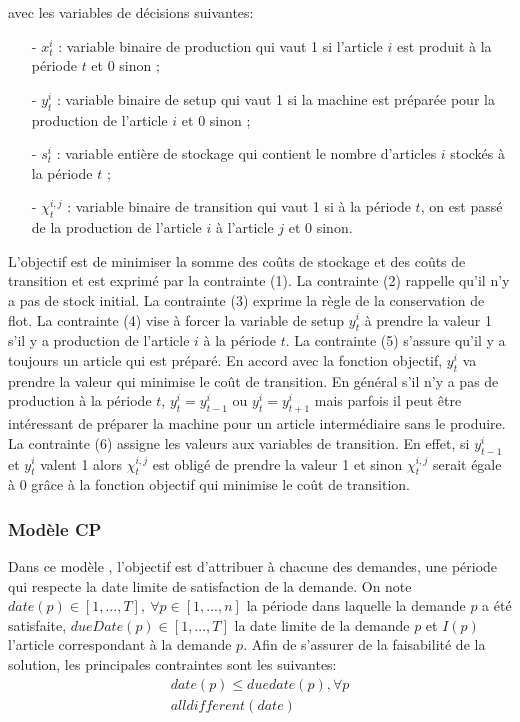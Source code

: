 		avec les variables de décisions suivantes: \\
		\begin{itemize}
			\item[-] $x_{t}^{i}$ : variable binaire de production qui vaut 1 si l’article $i$ est produit à la période $t$ et 0 sinon ;
			\item[-] $y_{t}^{i}$ : variable binaire de setup qui vaut 1 si la machine est préparée pour la production de l’article $i$ et 0 sinon ;
			\item[-] $s_{t}^{i}$ : variable entière de stockage qui contient le nombre d’articles $i$ stockés à la période $t$ ; 
			\item[-] $\chi_{t}^{i,j}$ : variable binaire de transition qui vaut 1 si à la période $t$, on est passé de la production de l’article $i$ à l’article $j$ et 0 sinon.
		\end{itemize}
		\vspace*{.3cm}
	\hspace*{.5cm} L'objectif est de minimiser la somme des coûts de stockage et des coûts de transition et est exprimé par la contrainte (1). La contrainte (2) rappelle qu'il n'y a pas de stock initial. La contrainte (3) exprime la règle de la conservation de flot. La contrainte (4) vise à forcer la variable de setup $y_{t}^{i}$ à prendre la valeur 1 s’il y a production de l’article $i$ à la période $t$. La contrainte (5) s'assure qu'il y a toujours un article qui est préparé. En accord avec la fonction objectif, $y_{t}^{i}$ va prendre la valeur qui minimise le coût de transition. En général s’il n’y a pas de production à la période $t$,
$y_{t}^{i} = y_{t-1}^{i}$ ou $y_{t}^{i} = y_{t+1}^{i}$
mais parfois il peut être intéressant de préparer la machine pour un article intermédiaire sans le produire. La contrainte (6) assigne les valeurs aux variables de transition.
En effet, si $y_{t-1}^{i}$ et $y_{t}^{i}$ valent 1 alors $\chi_{t}^{i,j}$ est obligé de prendre la valeur 1 et sinon $\chi_{t}^{i,j}$ serait égale à 0 grâce à la fonction objectif qui minimise le coût de transition.
		
		\subsubsection{Modèle CP}
		Dans ce modèle \cite{ratheil_master}, l’objectif est d’attribuer à chacune des demandes, une période qui respecte la date limite de satisfaction de la demande. On note $date(p) \in [1,...,T],\ \forall p \in [1,...,n]$ la période dans laquelle la demande $p$ a été satisfaite, $dueDate(p) \in [1,...,T]$ la date limite de la demande $p$ et $I(p)$ l'article correspondant à la demande $p$. Afin de s'assurer de la faisabilité de la solution, les principales contraintes sont les suivantes:
		\begin{eqnarray}
			date(p) \leq duedate(p), \forall p \\
			alldifferent(date)
		\end{eqnarray}
		
